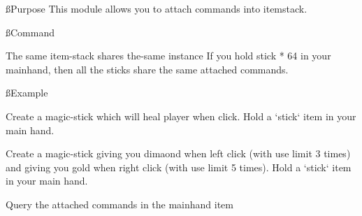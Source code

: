 
\ss{Purpose}
This module allows you to attach commands into itemstack.

\ss{Command}

\begin{note}{The same item-stack shares the-same instance}
    If you hold stick * 64 in your mainhand, then all the sticks share the same attached commands.
\end{note}

\ss{Example}
\begin{example}{Create a magic-stick which will heal player when click.}
    Hold a `stick` item in your main hand.
\end{example}

\begin{example}{Create a magic-stick giving you dimaond when left click (with use limit 3 times) and giving you gold when right click (with use limit 5 times).}
    Hold a `stick` item in your main hand.


\end{example}

\begin{example}{Query the attached commands in the mainhand item}
\end{example}
